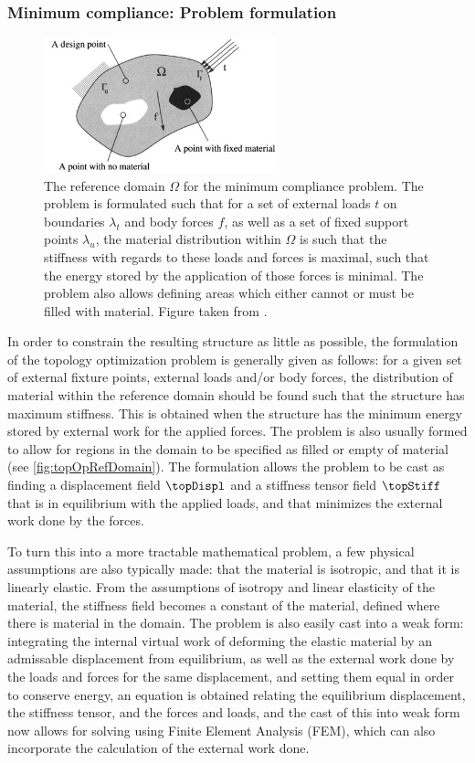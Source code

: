 \subsubsection{Minimum compliance: Problem formulation}
\begin{figure}
\centering
\includegraphics[width=0.6\textwidth]{Pictures/TopOp/design_domain.png}
\caption{The reference domain $\Omega$ for the minimum compliance problem. The problem is formulated such that for a set of external loads $t$ on boundaries $\lambda_t$ and body forces $f$, as well as a set of fixed support points $\lambda_u$, the material distribution within $\Omega$ is such that the stiffness with regards to these loads and forces is maximal, such that the energy stored by the application of those forces is minimal. The problem also allows defining areas which either cannot or must be filled with material. Figure taken from \cite{bendsoe2003topology}.}
\label{fig:topOpRefDomain}
\end{figure}
In order to constrain the resulting structure as little as possible, the formulation of the topology optimization problem is generally given as follows: for a given set of external fixture points, external loads and/or body forces, the distribution of material within the reference domain should be found such that the structure has maximum stiffness. This is obtained when the structure has the minimum energy stored by external work for the applied forces. The problem is also usually formed to allow for regions in the domain to be specified as filled or empty of material (see \autoref{fig:topOpRefDomain}). The formulation allows the problem to be cast as finding a displacement field $\topDispl$ and a stiffness tensor field $\topStiff$ that is in equilibrium with the applied loads, and that minimizes the external work done by the forces. 

To turn this into a more tractable mathematical problem, a few physical assumptions are also typically made: that the material is isotropic, and that it is linearly elastic. From the assumptions of isotropy and linear elasticity of the material, the stiffness field becomes a constant of the material, defined where there is material in the domain. The problem is also easily cast into a weak form: integrating the internal virtual work of deforming the elastic material by an admissable displacement from equilibrium, as well as the external work done by the loads and forces for the same displacement, and setting them equal in order to conserve energy, an equation is obtained relating the equilibrium displacement, the stiffness tensor, and the forces and loads, and the cast of this into weak form now allows for solving using Finite Element Analysis (FEM), which can also incorporate the calculation of the external work done.

